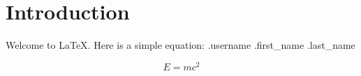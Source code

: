\documentclass{article}
\begin{document}
\section{Introduction}
Welcome to LaTeX. Here is a simple equation:
{{.username}} {{.first_name}} {{.last_name}}

\begin{equation}
E = mc^2
\end{equation}
\end{document}

